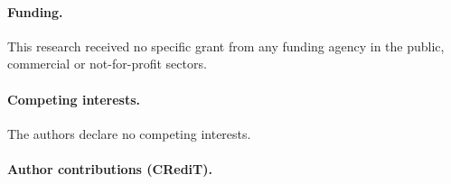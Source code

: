 \documentclass[11pt,a4paper]{article}
\newif\ifshowverify
\newcommand{\verify}[1]{\ifshowverify\textcolor{red}{\,[\textit{Authors to complete:} #1]}\fi}
\begin{document}
\paragraph{Funding.} This research received no specific grant from any funding agency in the public, commercial or not-for-profit sectors.\verify{confirm}

\paragraph{Competing interests.} The authors declare no competing interests.

\paragraph{Author contributions (CRediT).} \verify{assign roles to each author, e.g.\ E.\,Opoku: Conceptualisation, Supervision, Writing -- review \& editing; A.\,A.\,Adu: Methodology, Validation; H.\,Emmanuel: Formal analysis, Visualisation; O.\,Enock: Software, Data curation, Writing -- original draft. All authors read and approved the final manuscript.}
\end{document}
